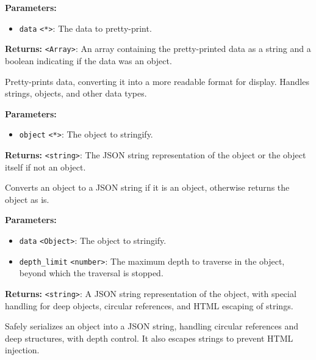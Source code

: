 \documentclass[12pt,a4paper]{article}
\begin{document}
\noindent \textbf{Parameters:}
\begin{itemize}
  \item \texttt{data} \texttt{<*>}: The data to pretty-print.
\end{itemize}

\noindent \textbf{Returns:} \texttt{<Array>}: An array containing the pretty-printed data as a string and a boolean indicating if the data was an object.

\noindent Pretty-prints data, converting it into a more readable format for display. Handles strings, objects, and other data types.

\vspace{5mm}
\noindent {}


\noindent \textbf{Parameters:}
\begin{itemize}
  \item \texttt{object} \texttt{<*>}: The object to stringify.
\end{itemize}

\noindent \textbf{Returns:} \texttt{<string>}: The JSON string representation of the object or the object itself if not an object.

\noindent Converts an object to a JSON string if it is an object, otherwise returns the object as is.

\vspace{5mm}
\noindent {}


\noindent \textbf{Parameters:}
\begin{itemize}
  \item \texttt{data} \texttt{<Object>}: The object to stringify.
  \item \texttt{depth\_limit} \texttt{<number>}: The maximum depth to traverse in the object, beyond which the traversal is stopped.
\end{itemize}

\noindent \textbf{Returns:} \texttt{<string>}: A JSON string representation of the object, with special handling for deep objects, circular references, and HTML escaping of strings.

\noindent Safely serializes an object into a JSON string, handling circular references and deep structures, with depth control.
It also escapes strings to prevent HTML injection.
\end{document}
